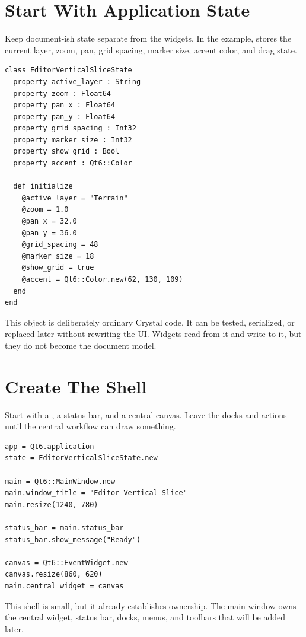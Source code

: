 \section{Start With Application State}

Keep document-ish state separate from the widgets. In the example,  stores the current layer, zoom, pan, grid spacing, marker size, accent color, and drag state.

\begin{lstlisting}[style=crystal]
class EditorVerticalSliceState
  property active_layer : String
  property zoom : Float64
  property pan_x : Float64
  property pan_y : Float64
  property grid_spacing : Int32
  property marker_size : Int32
  property show_grid : Bool
  property accent : Qt6::Color

  def initialize
    @active_layer = "Terrain"
    @zoom = 1.0
    @pan_x = 32.0
    @pan_y = 36.0
    @grid_spacing = 48
    @marker_size = 18
    @show_grid = true
    @accent = Qt6::Color.new(62, 130, 109)
  end
end
\end{lstlisting}

This object is deliberately ordinary Crystal code. It can be tested, serialized, or replaced later without rewriting the UI. Widgets read from it and write to it, but they do not become the document model.

\section{Create The Shell}

Start with a , a status bar, and a central canvas. Leave the docks and actions until the central workflow can draw something.

\begin{lstlisting}[style=crystal]
app = Qt6.application
state = EditorVerticalSliceState.new

main = Qt6::MainWindow.new
main.window_title = "Editor Vertical Slice"
main.resize(1240, 780)

status_bar = main.status_bar
status_bar.show_message("Ready")

canvas = Qt6::EventWidget.new
canvas.resize(860, 620)
main.central_widget = canvas
\end{lstlisting}

This shell is small, but it already establishes ownership. The main window owns the central widget, status bar, docks, menus, and toolbars that will be added later.

